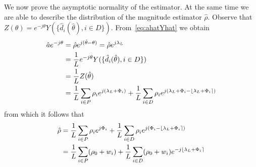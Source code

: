 \documentclass[a4paper,10pt]{article}
\begin{document}
We now prove the asymptotic normality of the estimator.  At the same time we are able to describe the distribution of the magnitude estimator $\hat{\rho}$.  Observe that $Z(\theta) = e^{-j\theta}Y(\{\hat{d}_i(\hat{\theta}), i \in D\})$.  From~\eqref{eq:ahatYhat} we obtain
\begin{align*}\label{eq:hata}
\hat{a} e^{-j\theta} &= \hat{\rho} e^{j(\hat{\theta} - \theta)} = \hat{\rho} e^{j\lambda_L} \\
&= \frac{1}{L} e^{-j\theta} Y(\{\hat{d}_i(\hat{\theta}), i \in D\}) \\
&= \frac{1}{L}  Z(\hat{\theta}) \\
&= \frac{1}{L} \sum_{i \in P} \rho_i e^{j(\lambda_L + \Phi_i)} + \frac{1}{L}  \sum_{i \in D}  \rho_i e^{j( \lambda_L + \Phi_i - {\left\lfloor \lambda_L + \Phi_i \right\rceil})}
\end{align*}
from which it follows that
\begin{align*}\label{eq:hatrhoworking}
\hat{\rho} &=  \frac{1}{L} \sum_{i \in P} \rho_i e^{j\Phi_i} + \frac{1}{L}  \sum_{i \in D}  \rho_i e^{j(\Phi_i - {\left\lfloor \lambda_L + \Phi_i \right\rceil})} \\
 &=  \frac{1}{L} \sum_{i \in P} (\rho_0 + w_i) + \frac{1}{L}  \sum_{i \in D}  (\rho_0 + w_i)e^{-j{\left\lfloor \lambda_L + \Phi_i \right\rceil}} 
\end{align*}


\end{document}
